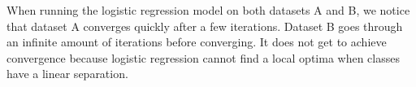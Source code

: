 \begin{answer}

When running the logistic regression model on both datasets A and B, we notice that dataset A converges quickly after a few iterations. Dataset B goes through an infinite amount of iterations before converging. It does not get to achieve convergence because logistic regression cannot find a local optima when classes have a linear separation.

\end{answer}
